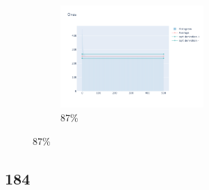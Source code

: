 \documentclass[12pt, fleqn]{report}                             %
\theoremstyle{break}                                            %
\begin{document}
\begin{figure}[ht!]
\begin{subfigure}[b]{0.4\linewidth}
          \includegraphics[width=0.6\textwidth]{Images/178/dia-d.png}
          \caption{87\%}
        \end{subfigure}
      \end{figure}


      \clearpage
      \subsection{184}
\end{document}
